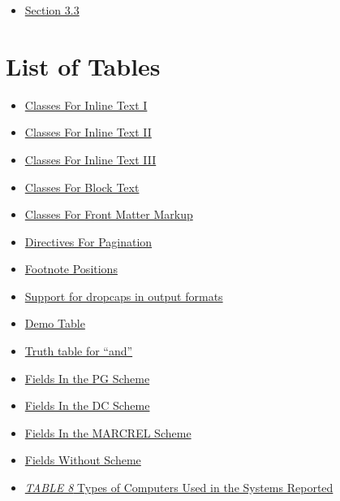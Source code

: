 \documentclass[a5paper]{book}
\begin{document}
\begin{german}
\begin{contents_env}
\begin{itemize}
\begin{itemize}
\item[] \hyperlink{section-3-3}{Section 3.3}
\end{itemize}
\end{itemize}
\end{contents_env}

\cleardoublepage
\label{id2}%
\hypertarget{id2}{}%
%
\chapter*{
List of Tables}


\begin{itemize}
\item[] \hyperlink{table-46}{Classes For Inline Text I}

\item[] \hyperlink{table-47}{Classes For Inline Text II}

\item[] \hyperlink{table-48}{Classes For Inline Text III}

\item[] \hyperlink{table-49}{Classes For Block Text}

\item[] \hyperlink{table-50}{Classes For Front Matter Markup}

\item[] \hyperlink{table-51}{Directives For Pagination}

\item[] \hyperlink{table-52}{Footnote Positions}

\item[] \hyperlink{table-53}{Support for dropcaps in output formats}

\item[] \hyperlink{table-54}{Demo Table}

\item[] \hyperlink{table-55}{Truth table for “and”}

\item[] \hyperlink{table-56}{Fields In the PG Scheme}

\item[] \hyperlink{table-57}{Fields In the DC Scheme}

\item[] \hyperlink{table-58}{Fields In the MARCREL Scheme}

\item[] \hyperlink{table-59}{Fields Without Scheme}

\item[] \hyperlink{table-60}{{\itshape{TABLE 8}} Types of Computers Used in the Systems Reported}
\end{itemize}


\end{german}
\end{document}
